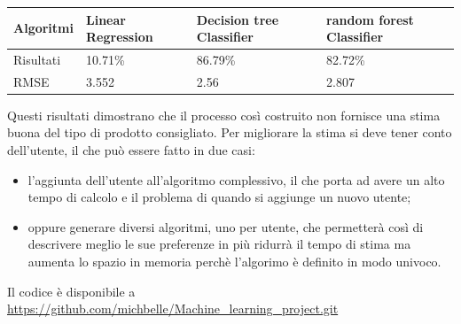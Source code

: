 \documentclass{article}
\begin{document}
\begin{tabular}{|p{}|p{}|p{}|p{}|}
\hline
Algoritmi &Linear Regression          & Decision tree Classifier         &random forest Classifier      \\
\hline
Risultati & 10.71\%           & 86.79\%    & 82.72\%          \\
\hline
RMSE &3.552 &2.56 &2.807\\
\hline
\end{tabular}

Questi risultati dimostrano che il processo così costruito non fornisce una stima buona del tipo di prodotto consigliato. Per migliorare la stima si deve tener conto dell'utente, il che può essere fatto in due casi:
\begin{itemize}
\item l'aggiunta dell'utente all'algoritmo complessivo, il che porta ad avere un alto tempo di calcolo e il problema  di quando si aggiunge un nuovo utente;
\item oppure generare diversi algoritmi, uno per utente, che permetterà così di descrivere meglio le sue preferenze in più ridurrà il tempo di stima ma aumenta lo spazio in memoria perchè l'algorimo è definito in modo univoco.
\end{itemize}
Il codice è disponibile a \url{https://github.com/michbelle/Machine_learning_project.git}
\end{document}
